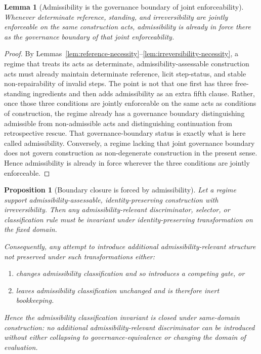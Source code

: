 \documentclass[11pt]{article}
\newtheorem{lemma}[theorem]{Lemma}
\newtheorem{proposition}[theorem]{Proposition}
\theoremstyle{definition}
\theoremstyle{remark}
\begin{document}
\begin{lemma}[Admissibility is the governance boundary of joint enforceability]\label{lem:admissibility-joint}
Whenever determinate reference, standing, and irreversibility are jointly enforceable on the same construction acts, admissibility is already in force there as the governance boundary of that joint enforceability.
\end{lemma}

\begin{proof}
By Lemmas~\ref{lem:reference-necessity}--\ref{lem:irreversibility-necessity}, a regime that treats its acts as determinate, admissibility-assessable construction acts must already maintain determinate reference, licit step-status, and stable non-repairability of invalid steps. The point is not that one first has three free-standing ingredients and then adds admissibility as an extra fifth clause. Rather, once those three conditions are jointly enforceable on the same acts as conditions of construction, the regime already has a governance boundary distinguishing admissible from non-admissible acts and distinguishing continuation from retrospective rescue. That governance-boundary status is exactly what is here called admissibility. Conversely, a regime lacking that joint governance boundary does not govern construction as non-degenerate construction in the present sense. Hence admissibility is already in force wherever the three conditions are jointly enforceable.
\end{proof}

\begin{proposition}[Boundary closure is forced by admissibility]\label{prop:boundary-closure-forced}
Let a regime support admissibility-assessable, identity-preserving construction with irreversibility. Then any admissibility-relevant discriminator, selector, or classification rule must be invariant under identity-preserving transformation on the fixed domain.

Consequently, any attempt to introduce additional admissibility-relevant structure not preserved under such transformations either:
\begin{enumerate}[label=(\roman*)]
    \item changes admissibility classification and so introduces a competing gate, or
    \item leaves admissibility classification unchanged and is therefore inert bookkeeping.
\end{enumerate}
Hence the admissibility classification invariant is closed under same-domain construction: no additional admissibility-relevant discriminator can be introduced without either collapsing to governance-equivalence or changing the domain of evaluation.
\end{proposition}
\end{document}
